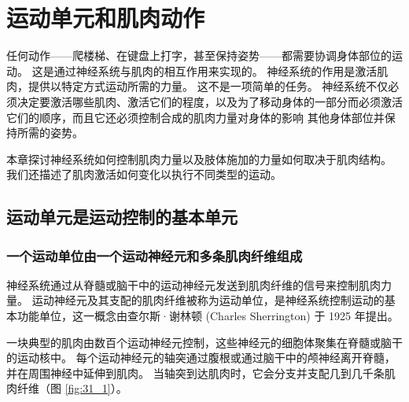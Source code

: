 \chapter{运动单元和肌肉动作} \label{chap:chap31}

任何动作——爬楼梯、在键盘上打字，甚至保持姿势——都需要协调身体部位的运动。 这是通过神经系统与肌肉的相互作用来实现的。 神经系统的作用是激活肌肉，提供以特定方式运动所需的力量。 这不是一项简单的任务。 神经系统不仅必须决定要激活哪些肌肉、激活它们的程度，以及为了移动身体的一部分而必须激活它们的顺序，而且它还必须控制合成的肌肉力量对身体的影响 其他身体部位并保持所需的姿势。

本章探讨神经系统如何控制肌肉力量以及肢体施加的力量如何取决于肌肉结构。 我们还描述了肌肉激活如何变化以执行不同类型的运动。

\section{运动单元是运动控制的基本单元}
\subsection{一个运动单位由一个运动神经元和多条肌肉纤维组成}
神经系统通过从脊髓或脑干中的运动神经元发送到肌肉纤维的信号来控制肌肉力量。 运动神经元及其支配的肌肉纤维被称为运动单位，是神经系统控制运动的基本功能单位，这一概念由查尔斯·谢林顿 (Charles Sherrington) 于 1925 年提出。

一块典型的肌肉由数百个运动神经元控制，这些神经元的细胞体聚集在脊髓或脑干的运动核中。 每个运动神经元的轴突通过腹根或通过脑干中的颅神经离开脊髓，并在周围神经中延伸到肌肉。 
当轴突到达肌肉时，它会分支并支配几到几千条肌肉纤维（图 \ref{fig:31_1}）。


